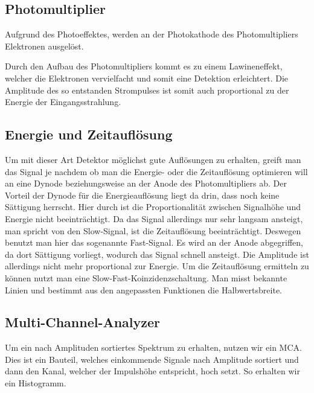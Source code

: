 \documentclass[11pt, ngerman, fleqn, DIV=15, headinclude, BCOR=2cm]{scrreprt}
\begin{document}
\subsection{Photomultiplier}
Aufgrund des Photoeffektes, werden an der Photokathode des Photomultipliers
Elektronen ausgelöst.

Durch den Aufbau des Photomultipliers kommt es zu einem Lawineneffekt,
welcher die Elektronen vervielfacht und somit eine Detektion erleichtert.
Die Amplitude des so entstanden Strompulses ist somit auch proportional zu der
Energie der Eingangsstrahlung.

\subsection{Energie und Zeitauflösung}
Um mit dieser Art Detektor möglichst gute Auflösungen zu erhalten, greift man
das Signal je nachdem ob man die Energie- oder die Zeitauflösung optimieren will
an eine Dynode beziehungsweise an der Anode des Photomultipliers ab.
Der Vorteil der Dynode für die Energieauflösung liegt da drin, dass noch keine
Sättigung herrscht. Hier durch ist die Proportionalität zwischen Signalhöhe und
Energie nicht beeinträchtigt. Da das Signal allerdings nur sehr langsam
ansteigt, man spricht von den Slow-Signal, ist die Zeitauflösung beeinträchtigt.
Deswegen benutzt man hier das sogenannte Fast-Signal. Es wird an der Anode
abgegriffen, da dort Sättigung vorliegt, wodurch das Signal schnell ansteigt.
Die Amplitude ist allerdings nicht mehr proportional zur Energie.
Um die Zeitauflösung ermitteln zu können nutzt man eine
Slow-Fast-Koinzidenzschaltung. Man misst bekannte Linien und bestimmt aus den
angepassten Funktionen die Halbwertsbreite.


\subsection{Multi-Channel-Analyzer}
Um ein nach Amplituden sortiertes Spektrum zu erhalten, nutzen wir ein MCA.
Dies ist ein Bauteil, welches einkommende Signale nach Amplitude sortiert und
dann den Kanal, welcher der Impulshöhe entspricht, hoch setzt. So erhalten wir ein
Histogramm.
\end{document}
